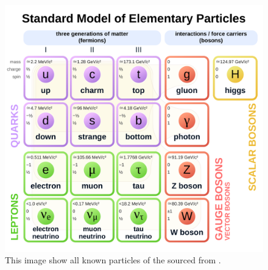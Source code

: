 \begin{figure}[htbp]
    \centering
    \includegraphics[width=1.0\textwidth]{images/Theory/StandardModel.pdf}
    \caption[The Standard Model of Particle Physics]{This image show all known particles of the  sourced from \cite{StandardModelPic}.}
    \label{fig:StandardModel}
\end{figure}

